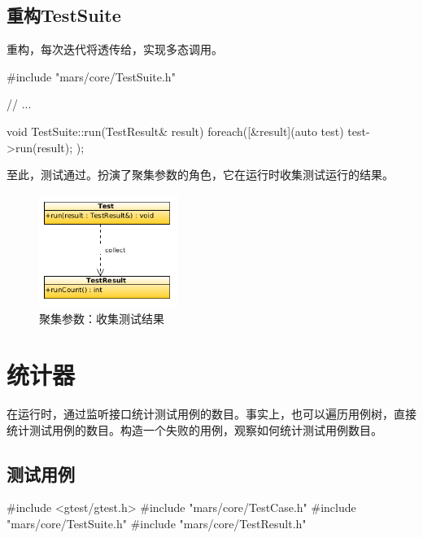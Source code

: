\begin{content}
\subsection{重构TestSuite}

重构，每次迭代将透传给，实现多态调用。

\begin{leftbar}
 \begin{c++}[caption={\ttfamily{src/mars/core/TestSuite.cc}}]
#include "mars/core/TestSuite.h"

// ...

void TestSuite::run(TestResult& result) {
  foreach([&result](auto test) {
    test->run(result);
  });
}
 \end{c++}
\end{leftbar}

至此，测试通过。扮演了聚集参数的角色，它在运行时收集测试运行的结果。

\begin{figure}[H]
\centering
\includegraphics[width=0.4\textwidth]{figures/xunit/test-result.png}
\caption{聚集参数：收集测试结果}
 \label{fig:test-tree}
\end{figure}

\section{统计器}

在运行时，通过监听接口统计测试用例的数目。事实上，也可以遍历用例树，直接统计测试用例的数目。构造一个失败的用例，观察如何统计测试用例数目。

\subsection{测试用例}

\begin{leftbar}
 \begin{c++}[caption={\ttfamily{test/mars/core/TestSuiteSpec.cc}}]
#include <gtest/gtest.h>
#include "mars/core/TestCase.h"
#include "mars/core/TestSuite.h"
#include "mars/core/TestResult.h"


\end{c++}
\end{leftbar}
\end{content}
